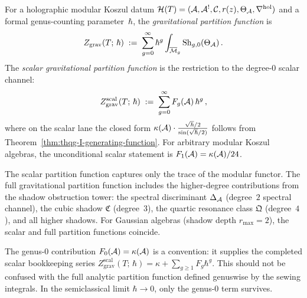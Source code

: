 \begin{definition}
\label{def:thqg-I-grav-partition}
For a holographic modular Koszul datum $\mathcal{H}(T) = (\mathcal{A}, \mathcal{A}^!, \mathcal{C}, r(z), \Theta_{\mathcal{A}}, \nabla^{\mathrm{hol}})$ and a formal genus-counting parameter~$\hbar$, the \emph{gravitational partition function} is
\begin{equation}\label{eq:thqg-I-Z-grav-def}
Z_{\mathrm{grav}}(T;\,\hbar) \;:=\; \sum_{g=0}^{\infty} \hbar^g \int_{\overline{\mathcal{M}}_{g}} \operatorname{Sh}_{g,0}(\Theta_{\mathcal{A}})\,.
\end{equation}
The \emph{scalar gravitational partition function} is the restriction to the degree-$0$ scalar channel:
\begin{equation}\label{eq:thqg-I-Z-grav-scalar}
Z_{\mathrm{grav}}^{\mathrm{scal}}(T;\,\hbar) \;:=\; \sum_{g=0}^{\infty} F_g(\mathcal{A})\,\hbar^g\,,
\end{equation}
where on the scalar lane the closed form
$\kappa(\mathcal{A}) \cdot \frac{\sqrt{\hbar}/2}{\sin(\sqrt{\hbar}/2)}$
follows from Theorem~\ref{thm:thqg-I-generating-function}. For
arbitrary modular Koszul algebras, the unconditional scalar statement
is $F_1(\mathcal{A})=\kappa(\mathcal{A})/24$.
\end{definition}

\begin{remark}
\label{rem:thqg-I-scalar-vs-full}
The scalar partition function captures only the trace of the modular functor. The full gravitational partition function includes the higher-degree contributions from the shadow obstruction tower: the spectral discriminant $\Delta_{\mathcal{A}}$ (degree~$2$ spectral channel), the cubic shadow $\mathfrak{C}$ (degree~$3$), the quartic resonance class $\mathfrak{Q}$ (degree~$4$), and all higher shadows. For Gaussian algebras (shadow depth $r_{\max} = 2$), the scalar and full partition functions coincide.
\end{remark}

\begin{remark}
\label{rem:thqg-I-genus-0}
The genus-$0$ contribution $F_0(\mathcal{A}) = \kappa(\mathcal{A})$ is a convention: it
supplies the completed scalar bookkeeping series
$Z_{\mathrm{grav}}^{\mathrm{scal}}(T;\,\hbar)
= \kappa + \sum_{g \geq 1} F_g \hbar^g$. This should not be confused
with the full analytic partition function defined genuswise by the
sewing integrals. In the semiclassical limit $\hbar \to 0$, only the
genus-$0$ term survives.
\end{remark}

